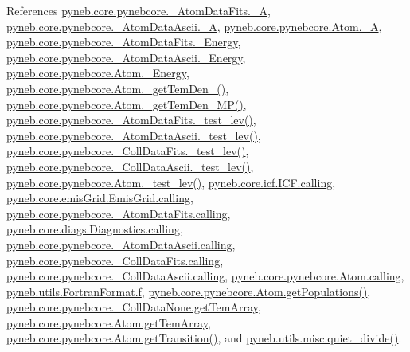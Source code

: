References \hyperlink{pynebcore_8py_source_l00093}{pyneb.\+core.\+pynebcore.\+\_\+\+Atom\+Data\+Fits.\+\_\+\+A}, \hyperlink{pynebcore_8py_source_l00402}{pyneb.\+core.\+pynebcore.\+\_\+\+Atom\+Data\+Ascii.\+\_\+\+A}, \hyperlink{pynebcore_8py_source_l01256}{pyneb.\+core.\+pynebcore.\+Atom.\+\_\+\+A}, \hyperlink{pynebcore_8py_source_l00094}{pyneb.\+core.\+pynebcore.\+\_\+\+Atom\+Data\+Fits.\+\_\+\+Energy}, \hyperlink{pynebcore_8py_source_l00400}{pyneb.\+core.\+pynebcore.\+\_\+\+Atom\+Data\+Ascii.\+\_\+\+Energy}, \hyperlink{pynebcore_8py_source_l01257}{pyneb.\+core.\+pynebcore.\+Atom.\+\_\+\+Energy}, \hyperlink{pynebcore_8py_source_l01803}{pyneb.\+core.\+pynebcore.\+Atom.\+\_\+get\+Tem\+Den\+\_()}, \hyperlink{pynebcore_8py_source_l01980}{pyneb.\+core.\+pynebcore.\+Atom.\+\_\+get\+Tem\+Den\+\_\+\+M\+P()}, \hyperlink{pynebcore_8py_source_l00171}{pyneb.\+core.\+pynebcore.\+\_\+\+Atom\+Data\+Fits.\+\_\+test\+\_\+lev()}, \hyperlink{pynebcore_8py_source_l00435}{pyneb.\+core.\+pynebcore.\+\_\+\+Atom\+Data\+Ascii.\+\_\+test\+\_\+lev()}, \hyperlink{pynebcore_8py_source_l00660}{pyneb.\+core.\+pynebcore.\+\_\+\+Coll\+Data\+Fits.\+\_\+test\+\_\+lev()}, \hyperlink{pynebcore_8py_source_l01026}{pyneb.\+core.\+pynebcore.\+\_\+\+Coll\+Data\+Ascii.\+\_\+test\+\_\+lev()}, \hyperlink{pynebcore_8py_source_l01459}{pyneb.\+core.\+pynebcore.\+Atom.\+\_\+test\+\_\+lev()}, \hyperlink{icf_8py_source_l00016}{pyneb.\+core.\+icf.\+I\+C\+F.\+calling}, \hyperlink{emis_grid_8py_source_l00041}{pyneb.\+core.\+emis\+Grid.\+Emis\+Grid.\+calling}, \hyperlink{pynebcore_8py_source_l00090}{pyneb.\+core.\+pynebcore.\+\_\+\+Atom\+Data\+Fits.\+calling}, \hyperlink{diags_8py_source_l00169}{pyneb.\+core.\+diags.\+Diagnostics.\+calling}, \hyperlink{pynebcore_8py_source_l00311}{pyneb.\+core.\+pynebcore.\+\_\+\+Atom\+Data\+Ascii.\+calling}, \hyperlink{pynebcore_8py_source_l00568}{pyneb.\+core.\+pynebcore.\+\_\+\+Coll\+Data\+Fits.\+calling}, \hyperlink{pynebcore_8py_source_l00918}{pyneb.\+core.\+pynebcore.\+\_\+\+Coll\+Data\+Ascii.\+calling}, \hyperlink{pynebcore_8py_source_l01175}{pyneb.\+core.\+pynebcore.\+Atom.\+calling}, \hyperlink{_fortran_format_8py_source_l00318}{pyneb.\+utils.\+Fortran\+Format.\+f}, \hyperlink{pynebcore_8py_source_l01496}{pyneb.\+core.\+pynebcore.\+Atom.\+get\+Populations()}, \hyperlink{pynebcore_8py_source_l00068}{pyneb.\+core.\+pynebcore.\+\_\+\+Coll\+Data\+None.\+get\+Tem\+Array}, \hyperlink{pynebcore_8py_source_l01248}{pyneb.\+core.\+pynebcore.\+Atom.\+get\+Tem\+Array}, \hyperlink{pynebcore_8py_source_l01406}{pyneb.\+core.\+pynebcore.\+Atom.\+get\+Transition()}, and \hyperlink{misc_8py_source_l00260}{pyneb.\+utils.\+misc.\+quiet\+\_\+divide()}.



